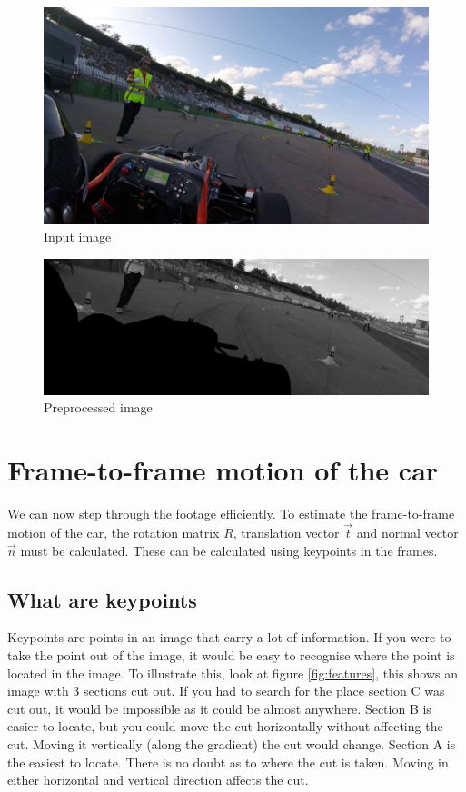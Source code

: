 \begin{figure}
    \centering
    \includegraphics[width=1\textwidth]{figures/input_image.jpg}
    \caption{Input image}
    \label{fig:input_image}
\end{figure}

\begin{figure}
    \centering
    \includegraphics[width=1\textwidth]{figures/output_image.jpg}
    \caption{Preprocessed image}
    \label{fig:output_image}
\end{figure}

\section{Frame-to-frame motion of the car}
We can now step through the footage efficiently. To estimate the frame-to-frame motion of the car, the rotation matrix ${R}$, translation vector $\vec{t}$ and normal vector $\vec{n}$ must be calculated. These can be calculated using keypoints in the frames. 

\subsection{What are keypoints}
Keypoints are points in an image that carry a lot of information. If you were to take the point out of the image, it would be easy to recognise where the point is located in the image. To illustrate this, look at figure \autoref{fig:features}, this shows an image with 3 sections cut out. If you had to search for the place section C was cut out, it would be impossible as it could be almost anywhere. Section B is easier to locate, but you could move the cut horizontally without affecting the cut. Moving it vertically (along the gradient) the cut would change. Section A is the easiest to locate. There is no doubt as to where the cut is taken. Moving in either horizontal and vertical direction affects the cut.\bigskip

